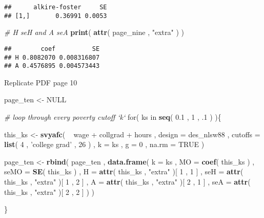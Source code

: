 \documentclass[]{book}
\newenvironment{Shaded}{\begin{snugshade}}{\end{snugshade}}
\newcommand{\KeywordTok}[1]{\textcolor[rgb]{0.13,0.29,0.53}{\textbf{{#1}}}}
\newcommand{\DataTypeTok}[1]{\textcolor[rgb]{0.13,0.29,0.53}{{#1}}}
\newcommand{\DecValTok}[1]{\textcolor[rgb]{0.00,0.00,0.81}{{#1}}}
\newcommand{\FloatTok}[1]{\textcolor[rgb]{0.00,0.00,0.81}{{#1}}}
\newcommand{\StringTok}[1]{\textcolor[rgb]{0.31,0.60,0.02}{{#1}}}
\newcommand{\CommentTok}[1]{\textcolor[rgb]{0.56,0.35,0.01}{\textit{{#1}}}}
\newcommand{\OtherTok}[1]{\textcolor[rgb]{0.56,0.35,0.01}{{#1}}}
\newcommand{\NormalTok}[1]{{#1}}
\theoremstyle{definition}
\theoremstyle{definition}
\theoremstyle{remark}
\begin{document}
\begin{verbatim}
##      alkire-foster     SE
## [1,]       0.36991 0.0053
\end{verbatim}

\begin{Shaded}
\begin{Highlighting}[]
\CommentTok{# H seH and A seA}
\KeywordTok{print}\NormalTok{( }\KeywordTok{attr}\NormalTok{( page_nine , }\StringTok{"extra"} \NormalTok{) )}
\end{Highlighting}
\end{Shaded}

\begin{verbatim}
##        coef          SE
## H 0.8082070 0.008316807
## A 0.4576895 0.004573443
\end{verbatim}

Replicate PDF page 10

\begin{Shaded}
\begin{Highlighting}[]
\NormalTok{page_ten <-}\StringTok{ }\OtherTok{NULL}

\CommentTok{# loop through every poverty cutoff `k`}
\NormalTok{for( ks in }\KeywordTok{seq}\NormalTok{( }\FloatTok{0.1} \NormalTok{, }\DecValTok{1} \NormalTok{, .}\DecValTok{1} \NormalTok{) )\{}
    
    \NormalTok{this_ks <-}
\StringTok{        }\KeywordTok{svyafc}\NormalTok{(}
            \NormalTok{~}\StringTok{ }\NormalTok{wage +}\StringTok{ }\NormalTok{collgrad +}\StringTok{ }\NormalTok{hours , }
            \DataTypeTok{design =} \NormalTok{des_nlsw88 , }
            \DataTypeTok{cutoffs =} \KeywordTok{list}\NormalTok{( }\DecValTok{4} \NormalTok{, }\StringTok{'college grad'} \NormalTok{, }\DecValTok{26} \NormalTok{) , }
            \DataTypeTok{k =} \NormalTok{ks , }
            \DataTypeTok{g =} \DecValTok{0} \NormalTok{, }
            \DataTypeTok{na.rm =} \OtherTok{TRUE} 
           \NormalTok{)}
    
    \NormalTok{page_ten <-}
\StringTok{        }\KeywordTok{rbind}\NormalTok{(}
            \NormalTok{page_ten ,}
            \KeywordTok{data.frame}\NormalTok{( }
                \DataTypeTok{k =} \NormalTok{ks , }
                \DataTypeTok{MO =} \KeywordTok{coef}\NormalTok{( this_ks ) ,}
                \DataTypeTok{seMO =} \KeywordTok{SE}\NormalTok{( this_ks ) ,}
                \DataTypeTok{H =} \KeywordTok{attr}\NormalTok{( this_ks , }\StringTok{"extra"} \NormalTok{)[ }\DecValTok{1} \NormalTok{, }\DecValTok{1} \NormalTok{] ,}
                \DataTypeTok{seH =} \KeywordTok{attr}\NormalTok{( this_ks , }\StringTok{"extra"} \NormalTok{)[ }\DecValTok{1} \NormalTok{, }\DecValTok{2} \NormalTok{] ,}
                \DataTypeTok{A =} \KeywordTok{attr}\NormalTok{( this_ks , }\StringTok{"extra"} \NormalTok{)[ }\DecValTok{2} \NormalTok{, }\DecValTok{1} \NormalTok{] ,}
                \DataTypeTok{seA =} \KeywordTok{attr}\NormalTok{( this_ks , }\StringTok{"extra"} \NormalTok{)[ }\DecValTok{2} \NormalTok{, }\DecValTok{2} \NormalTok{]}
          \NormalTok{)}
        \NormalTok{)}
    
\NormalTok{\}}
\end{Highlighting}
\end{Shaded}
\end{document}

